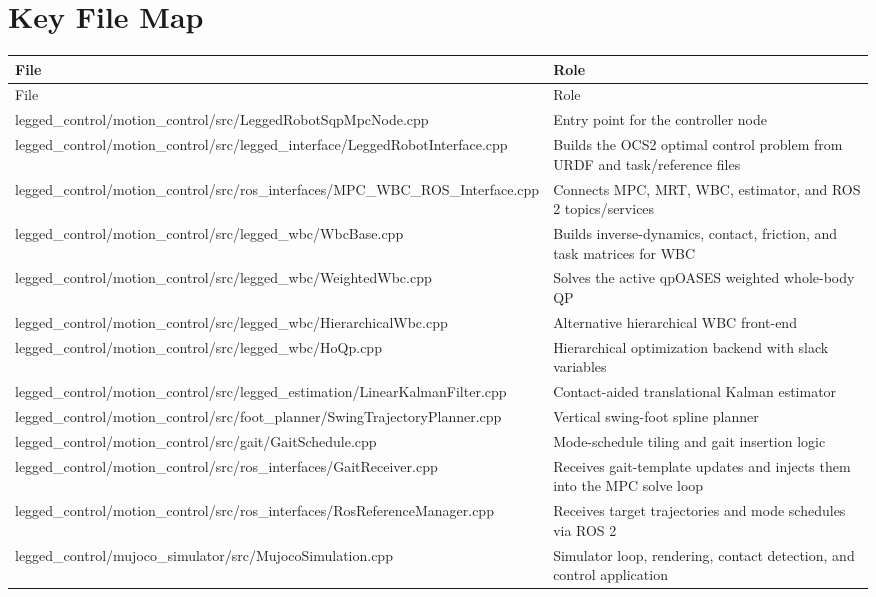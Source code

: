 \documentclass[11pt,a4paper]{article}
\begin{document}
\section{Key File Map}
\begin{longtable}{>{\ttfamily}p{} >{\raggedright\arraybackslash}p{}}
\toprule
File & Role \\
\midrule
\endfirsthead
\toprule
File & Role \\
\midrule
\endhead
legged\_control/motion\_control/src/LeggedRobotSqpMpcNode.cpp & Entry point for the controller node \\
legged\_control/motion\_control/src/legged\_interface/LeggedRobotInterface.cpp & Builds the OCS2 optimal control problem from URDF and task/reference files \\
legged\_control/motion\_control/src/ros\_interfaces/MPC\_WBC\_ROS\_Interface.cpp & Connects MPC, MRT, WBC, estimator, and ROS 2 topics/services \\
legged\_control/motion\_control/src/legged\_wbc/WbcBase.cpp & Builds inverse-dynamics, contact, friction, and task matrices for WBC \\
legged\_control/motion\_control/src/legged\_wbc/WeightedWbc.cpp & Solves the active qpOASES weighted whole-body QP \\
legged\_control/motion\_control/src/legged\_wbc/HierarchicalWbc.cpp & Alternative hierarchical WBC front-end \\
legged\_control/motion\_control/src/legged\_wbc/HoQp.cpp & Hierarchical optimization backend with slack variables \\
legged\_control/motion\_control/src/legged\_estimation/LinearKalmanFilter.cpp & Contact-aided translational Kalman estimator \\
legged\_control/motion\_control/src/foot\_planner/SwingTrajectoryPlanner.cpp & Vertical swing-foot spline planner \\
legged\_control/motion\_control/src/gait/GaitSchedule.cpp & Mode-schedule tiling and gait insertion logic \\
legged\_control/motion\_control/src/ros\_interfaces/GaitReceiver.cpp & Receives gait-template updates and injects them into the MPC solve loop \\
legged\_control/motion\_control/src/ros\_interfaces/RosReferenceManager.cpp & Receives target trajectories and mode schedules via ROS 2 \\
legged\_control/mujoco\_simulator/src/MujocoSimulation.cpp & Simulator loop, rendering, contact detection, and control application \\

\end{longtable}
\end{document}
